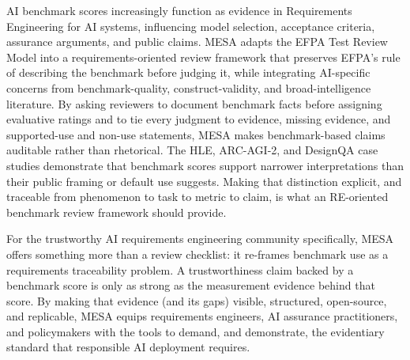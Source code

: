 \documentclass[conference]{IEEEtran}
\begin{document}
    AI benchmark scores increasingly function as evidence in Requirements Engineering for AI systems, influencing model selection, acceptance criteria, assurance arguments, and public claims. MESA adapts the EFPA Test Review Model into a requirements-oriented review framework that preserves EFPA's rule of describing the benchmark before judging it, while integrating AI-specific concerns from benchmark-quality, construct-validity, and broad-intelligence literature. By asking reviewers to document benchmark facts before assigning evaluative ratings and to tie every judgment to evidence, missing evidence, and supported-use and non-use statements, MESA makes benchmark-based claims auditable rather than rhetorical. The HLE, ARC-AGI-2, and DesignQA case studies demonstrate that benchmark scores support narrower interpretations than their public framing or default use suggests. Making that distinction explicit, and traceable from phenomenon to task to metric to claim, is what an RE-oriented benchmark review framework should provide.
    
    For the trustworthy AI requirements engineering community specifically, MESA offers something more than a review checklist: it re-frames benchmark use as a requirements traceability problem. A trustworthiness claim backed by a benchmark score is only as strong as the measurement evidence behind that score. By making that evidence (and its gaps) visible, structured, open-source, and replicable, MESA equips requirements engineers, AI assurance practitioners, and policymakers with the tools to demand, and demonstrate, the evidentiary standard that responsible AI deployment requires.

\balance


\end{document}
